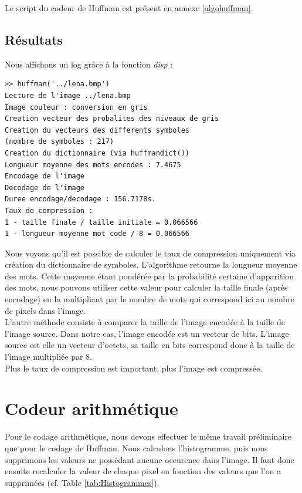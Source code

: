 \documentclass[a4paper, 12pt]{article}
\begin{document}
Le script du codeur de Huffman est présent en annexe \ref{algohuffman}.


\subsection{Résultats}

Nous affichons un log grâce à la fonction \textit{disp} :

\begin{verbatim}
>> huffman('../lena.bmp')
Lecture de l'image ../lena.bmp
Image couleur : conversion en gris
Creation vecteur des probalites des niveaux de gris
Creation du vecteurs des differents symboles
(nombre de symboles : 217)
Creation du dictionnaire (via huffmandict())
Longueur moyenne des mots encodes : 7.4675
Encodage de l'image
Decodage de l'image
Duree encodage/decodage : 156.7178s.
Taux de compression : 
1 - taille finale / taille initiale = 0.066566
1 - longueur moyenne mot code / 8 = 0.066566
\end{verbatim}

Nous voyons qu'il est possible de calculer le taux de compression uniquement via création du dictionnaire de symboles. L'algorithme retourne la longueur moyenne des mots. Cette moyenne étant pondérée par la probabilité certaine d'apparition des mots, nous pouvons utiliser cette valeur pour calculer la taille finale (après encodage) en la multipliant par le nombre de mots qui correspond ici au nombre de pixels dans l'image.\\

L'autre méthode consiste à comparer la taille de l'image encodée à la taille de l'image source. Dans notre cas, l'image encodée est un vecteur de bits. L'image source est elle un vecteur d'octets, sa taille en bits correspond donc à la taille de l'image multipliée par 8.\\

Plus le taux de compression est important, plus l'image est compressée. \\


\section{Codeur arithmétique}

Pour le codage arithmétique, nous devons effectuer le même travail préliminaire que pour le codage de Huffman. Nous calculons l'histogramme, puis nous supprimons les valeurs ne possédant aucune occurence dans l'image. Il faut donc ensuite recalculer la valeur de chaque pixel en fonction des valeurs que l'on a supprimées (cf. Table \ref{tab:Histogrammes}).\\
\end{document}
